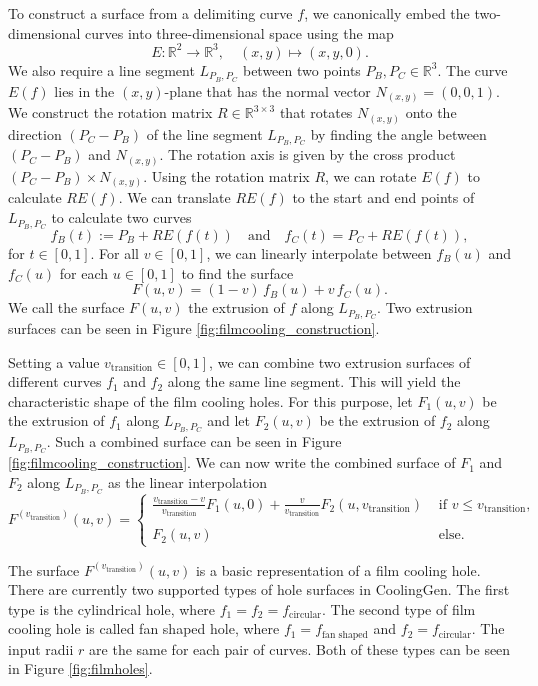 \documentclass[a4paper, 11pt]{report}
\theoremstyle{definition}
\begin{document}
	To construct a surface from a delimiting curve $f$, we canonically embed the two-dimensional curves into three-dimensional space using the map
		$$ E: \mathbb{R}^2 \rightarrow \mathbb{R}^3, \quad (x, y) \mapsto (x, y, 0). $$
	We also require a line segment $L_{P_B,P_C}$ between two points $P_B, P_C \in \mathbb{R}^3$.
	The curve $E(f)$ lies in the $(x,y)$-plane that has the normal vector $N_{(x,y)} = (0, 0, 1)$. We construct the rotation matrix $R \in \mathbb{R}^{3 \times 3}$ that rotates $N_{(x,y)}$ onto the direction $(P_C-P_B)$ of the line segment $L_{P_B,P_C}$ by finding the angle between $(P_C-P_B)$ and $N_{(x,y)}$. The rotation axis is given by the cross product $(P_C-P_B) \times N_{(x,y)}$. Using the rotation matrix $R$, we can rotate $E(f)$ to calculate $RE(f)$. We can translate $RE(f)$ to the start and end points of $L_{P_B,P_C}$ to calculate two curves
		$$ f_B(t) := P_B+RE(f(t)) \quad\textrm{and}\quad f_C(t) = P_C+RE(f(t)), $$
	for $t \in [0,1]$.
	For all $v \in [0,1]$, we can linearly interpolate between $f_B(u)$ and $f_C(u)$ for each $u \in [0,1]$ to find the surface 
		$$F(u,v) = (1-v)\,f_B(u) + v\,f_C(u).$$
	We call the surface $F(u,v)$ the extrusion of $f$ along $L_{P_B,P_C}$. Two extrusion surfaces can be seen in Figure \ref{fig:filmcooling_construction}.

	Setting a value $v_\textrm{transition} \in [0,1]$, we can combine two extrusion surfaces of different curves $f_1$ and $f_2$ along the same line segment. This will yield the characteristic shape of the film cooling holes. For this purpose, let $F_1(u,v)$ be the extrusion of $f_1$ along $L_{P_B,P_C}$ and let $F_2(u,v)$ be the extrusion of $f_2$ along $L_{P_B,P_C}$. Such a combined surface can be seen in Figure \ref{fig:filmcooling_construction}. We can now write the combined surface of $F_1$ and $F_2$ along $L_{P_B,P_C}$ as the linear interpolation
		$$
			F^{(v_\textrm{transition})}(u,v) = 
				\begin{cases}
					\frac{v_\textrm{transition}-v}{v_\textrm{transition}} F_1(u,0) + 
					\frac{v}{v_\textrm{transition}} F_2(u,v_\textrm{transition})
					& \textrm{ if } v \leq v_\textrm{transition}, \\

					\\[-0.5em]
					
					F_2(u,v)
					& \textrm{ else.} 
				\end{cases}
		$$

	The surface $F^{(v_\textrm{transition})}(u,v)$ is a basic representation of a film cooling hole. There are currently two supported types of hole surfaces in CoolingGen. The first type is the cylindrical hole, where $f_1 = f_2 = f_\textrm{circular}$. The second type of film cooling hole is called fan shaped hole, where $f_1 = f_\textrm{fan shaped}$ and $f_2 = f_\textrm{circular}$. The input radii $r$ are the same for each pair of curves. Both of these types can be seen in Figure \ref{fig:filmholes}.
\end{document}
